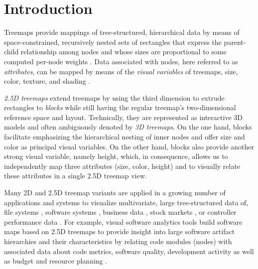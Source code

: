 
\section{Introduction}
\label{sec:introduction}

\noindent
Treemaps provide mappings of tree-structured, hierarchical data by means of space-constrained, recursively nested sets of rectangles that express the parent-child relationship among nodes and whose sizes are proportional to some computed per-node weights \cite{Shneiderman2009}.
Data associated with nodes, here referred to as \textit{attributes}, can be mapped by means of the 
\textit{visual variables} of treemaps, \eg size, color, texture, and shading \cite{Carpendale2003}.

\textit{2.5D treemaps} extend treemaps by using the third dimension to extrude rectangles to \textit{blocks} while still having the regular treemap's two-dimensional reference space and layout. 
Technically, they are represented as interactive 3D models and often ambiguously denoted by \textit{3D treemaps}. 
On the one hand, blocks facilitate emphasizing the hierarchical nesting of inner nodes and offer size and color as principal visual variables. 
On the other hand, blocks also provide another strong visual variable, namely height, 
which, in consequence, allows us to independently map three attributes (size, color, height) 
and to visually relate these attributes in a single 2.5D treemap view. 

Many 2D and 2.5D treemap variants are applied in a growing number of applications and systems to visualize multivariate, large tree-structured data of, \eg 
file systems \cite{Shneiderman1992}, 
software systems \cite{Wettel2008}, 
business data \cite{Vliegen2006}, 
stock markets \cite{Wattenberg1999}, or 
controller performance data \cite{Mitchell2004}.
For example, visual software analytics tools build software maps based on 2.5D treemaps 
to provide insight into large software artifact hierarchies and their characteristics 
by relating code modules (nodes) with associated data about 
code metrics, software quality, development activity as well as budget and resource planning \cite{Bohnet2011}.

